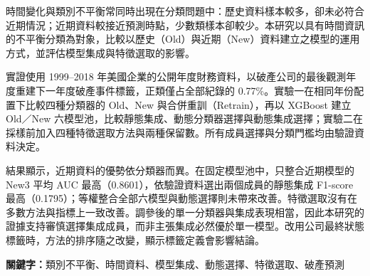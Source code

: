 時間變化與類別不平衡常同時出現在分類問題中：歷史資料樣本較多，卻未必符合近期情況；近期資料較接近預測時點，少數類樣本卻較少。本研究以具有時間資訊的不平衡分類為對象，比較以歷史（Old）與近期（New）資料建立之模型的運用方式，並評估模型集成與特徵選取的影響。

實證使用 1999--2018 年美國企業的公開年度財務資料，以破產公司的最後觀測年度重建下一年度破產事件標籤，正類僅占全部紀錄的 0.77\%。實驗一在相同年份配置下比較四種分類器的 Old、New 與合併重訓（Retrain），再以 XGBoost 建立 Old／New 六模型池，比較靜態集成、動態分類器選擇與動態集成選擇；實驗二在採樣前加入四種特徵選取方法與兩種保留數。所有成員選擇與分類門檻均由驗證資料決定。

結果顯示，近期資料的優勢依分類器而異。在固定模型池中，只整合近期模型的 New3 平均 AUC 最高（0.8601），依驗證資料選出兩個成員的靜態集成 F1-score 最高（0.1795）；等權整合全部六模型與動態選擇則未帶來改善。特徵選取沒有在多數方法與指標上一致改善。調參後的單一分類器與集成表現相當，因此本研究的證據支持審慎選擇集成成員，而非主張集成必然優於單一模型。改用公司最終狀態標籤時，方法的排序隨之改變，顯示標籤定義會影響結論。

\noindent\textbf{關鍵字：}類別不平衡、時間資料、模型集成、動態選擇、特徵選取、破產預測

